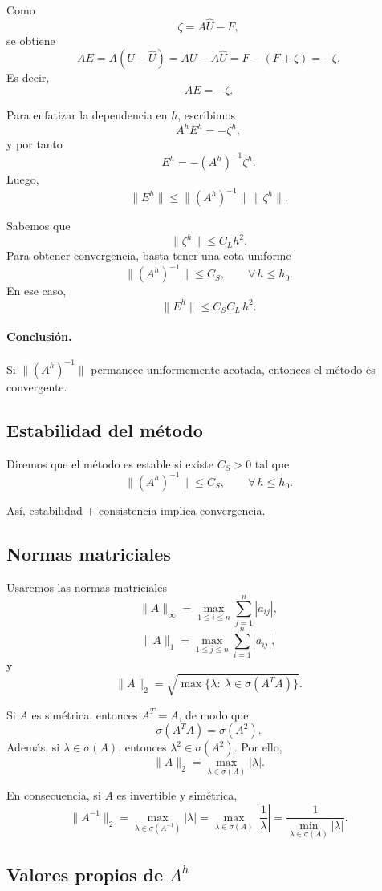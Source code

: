 Como
\[
\zeta=A\widehat U-F,
\]
se obtiene
\[
AE=A(U-\widehat U)=AU-A\widehat U=F-(F+\zeta)=-\zeta.
\]
Es decir,
\[
AE=-\zeta.
\]

Para enfatizar la dependencia en \(h\), escribimos
\[
A^hE^h=-\zeta^h,
\]
y por tanto
\[
E^h=-(A^h)^{-1}\zeta^h.
\]
Luego,
\[
\|E^h\|
\le
\|(A^h)^{-1}\|\,\|\zeta^h\|.
\]

Sabemos que
\[
\|\zeta^h\|\le C_L h^2.
\]
Para obtener convergencia, basta tener una cota uniforme
\[
\|(A^h)^{-1}\|\le C_S,
\qquad \forall\, h\le h_0.
\]
En ese caso,
\[
\|E^h\|
\le
C_SC_L\,h^2.
\]

\paragraph{Conclusión.}
Si \(\|(A^h)^{-1}\|\) permanece uniformemente acotada, entonces el método es convergente.

\subsection{Estabilidad del método}

Diremos que el método es estable si existe \(C_S>0\) tal que
\[
\|(A^h)^{-1}\|\le C_S,
\qquad \forall\, h\le h_0.
\]

Así, estabilidad \(+\) consistencia implica convergencia.

\subsection{Normas matriciales}

Usaremos las normas matriciales
\[
\|A\|_\infty=\max_{1\le i\le n}\sum_{j=1}^n |a_{ij}|,
\]
\[
\|A\|_1=\max_{1\le j\le n}\sum_{i=1}^n |a_{ij}|,
\]
y
\[
\|A\|_2=\sqrt{\max\{\lambda:\ \lambda\in\sigma(A^TA)\}}.
\]

Si \(A\) es simétrica, entonces \(A^T=A\), de modo que
\[
\sigma(A^TA)=\sigma(A^2).
\]
Además, si \(\lambda\in\sigma(A)\), entonces \(\lambda^2\in\sigma(A^2)\). Por ello,
\[
\|A\|_2=\max_{\lambda\in\sigma(A)}|\lambda|.
\]

En consecuencia, si \(A\) es invertible y simétrica,
\[
\|A^{-1}\|_2
=
\max_{\lambda\in\sigma(A^{-1})}|\lambda|
=
\max_{\lambda\in\sigma(A)}\left|\frac{1}{\lambda}\right|
=
\frac{1}{\min_{\lambda\in\sigma(A)}|\lambda|}.
\]

\subsection{Valores propios de \(A^h\)}

